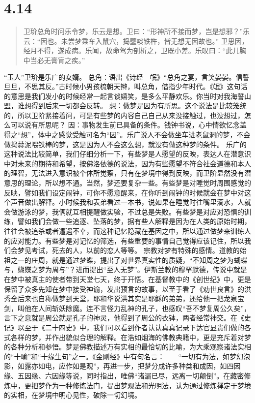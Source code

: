 \documentclass[]{book}
\begin{document}
\section{4.14}\label{section-193}

\begin{quote}
卫玠总角时问乐令梦，乐云是想。卫曰：``形神所不接而梦，岂是想邪？''乐云：``因也。未尝梦乘车入鼠穴，捣虀啖铁杵，皆无想无因故也。''
卫思因，经月不得，遂成病。乐闻，故命驾为剖析之，卫既小差。乐叹曰：``此儿胸中当必无膏肓之疾。''
\end{quote}

``玉人''卫玠是乐广的女婿。 总角：语出《诗经 -
氓》``总角之宴，言笑晏晏。信誓旦旦，不思其反。''古时候小男孩梳朝天辫，叫总角，借指少年时代。《氓》这句话的意思是我们发小的时候经常一起言谈嬉笑，是多么平静欢乐。你当时对我海誓山盟，谁想得到后来一切都会反转。
想：做梦是因为有所思。这个说法是比较笼统的，所以卫阶紧接着问，可是有些梦的内容自己自己从来没接触过，也没想过，怎么可以说有所思呢？
因：事物发生前已具备的条件。钱钟书说，心中情欲忆念盖得之``想''，体中之感觉受触可名为``因''。乐广说人不会做坐车进老鼠洞的梦，不会做捣蒜泥喂铁棒的梦，这是因为人不会这么想，就没有做这种梦的条件。
乐广的这种说法比较简单，我们仔细分析一下，有些梦是人愿望的反映，表达人在潜意识中对未来的期待和希望，按佛洛依德的说法，因为有些愿望不符合社会道德和本人的理智，无法进入意识被个体所觉察，只有在梦境中得到反映，而卫阶显然没有潜意思的理论，所以想不通。当然，梦还要复杂一些。有些梦是对睡觉时周围感觉的反映，譬如我们设定闹钟，可你不愿意醒来，在你听到闹钟的时候就会在梦中对这个声音做出解释。小时候我和表弟看过一本书，说如果在睡觉时往嘴里滴水，人就会做游泳的梦，我俩就互相提醒做实验，不过总是失败。有些梦是对应对恐惧的训练，譬如我们会做一些追逐、坠落的梦，据有些人解释是因为在人类的原始时期，往往会被追杀或者遭遇不幸，而这种记忆隐藏在基因之中，所以通过做梦来训练人的应对能力。有些梦是对记忆的筛选，有些重要的事情自己觉得应该记住，所以我们会梦见考试，死去的人，以前的恋人等等。
宗教对梦有特殊的感情。道教的始祖之一的庄周，就是通过梦蝶，提出了对世界真实性的质疑，``不知周之梦为蝴蝶与，蝴蝶之梦为周与''？进而提出``至人无梦''。伊斯兰教的穆罕默德，传说中就是在梦中被真主的使者带到天堂七天，终于开悟。在基督教中的《创世纪》中，更是保留了众多先知在梦中接受神谕，发出预言的故事，以至于看了《劝世良言》的洪秀全后来也自称做梦到天堂，耶和华说洪其实是耶稣的弟弟，还给他一把龙泉宝剑，叫他在人间斩妖除魔。连不言怪力乱神的孔子，也感叹``吾不梦复周公久矣''，言下之意就是周公就是孔子的神灵，他得到了周公的衣钵，两者经常神交。在《史记》以至于《二十四史》中，我们可以看到作者认认真真记录下达官显贵们做的各式各样的梦，并作出貌似合理的解释。在浩如烟海的佛教典籍中，更是充斥着对梦的各种分析和参悟。梦是佛教描述万有实相的最恰切的比喻，为大乘观察诸法实相的``十喻''和``十缘生句''之一。《金刚经》中有句名言：　　``一切有为法，如梦幻泡影，如露亦如电，应作如是观''，再进一步，把梦分成许多种类和成因，如四因缘、五因缘、六因缘等说，同时指出，唯佛``诸漏已尽，远离一切颠倒''。在藏密修炼中，更把梦作为一种修炼法门，提出梦观法和光明法，认为通过修炼禅定于梦境的实相，在梦境中明心见性，破除一切幻境。
\end{document}
